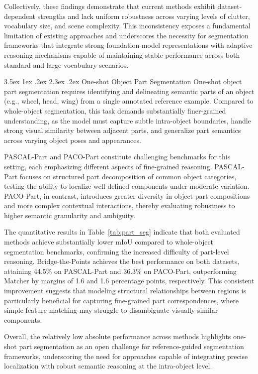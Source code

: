 \documentclass[journal,12pt,onecolumn,draftclsnofoot]{IEEEtran}
\makeatletter
\renewcommand{\section}{\@startsection{section}{1}{\z@}%
    {3.5ex \@plus 1ex \@minus .2ex}%
    {2.3ex \@plus.2ex}%
    {\normalfont\Large\bfseries}}
\makeatother
\begin{document}
Collectively, these findings demonstrate that current methods exhibit dataset-dependent strengths and lack uniform robustness across varying levels of clutter, vocabulary size, and scene complexity. This inconsistency exposes a fundamental limitation of existing approaches and underscores the necessity for segmentation frameworks that integrate strong foundation-model representations with adaptive reasoning mechanisms capable of maintaining stable performance across both standard and large-vocabulary scenarios.

\section{One-shot Object Part Segmentation}
One-shot object part segmentation requires identifying and delineating semantic parts of an object (e.g., wheel, head, wing) from a single annotated reference example. Compared to whole-object segmentation, this task demands substantially finer-grained understanding, as the model must capture subtle intra-object boundaries, handle strong visual similarity between adjacent parts, and generalize part semantics across varying object poses and appearances.

PASCAL-Part and PACO-Part constitute challenging benchmarks for this setting, each emphasizing different aspects of fine-grained reasoning. PASCAL-Part focuses on structured part decomposition of common object categories, testing the ability to localize well-defined components under moderate variation. PACO-Part, in contrast, introduces greater diversity in object-part compositions and more complex contextual interactions, thereby evaluating robustness to higher semantic granularity and ambiguity.

The quantitative results in Table~\ref{tab:part_seg} indicate that both evaluated methods achieve substantially lower mIoU compared to whole-object segmentation benchmarks, confirming the increased difficulty of part-level reasoning. Bridge-the-Points achieves the best performance on both datasets, attaining 44.5\% on PASCAL-Part and 36.3\% on PACO-Part, outperforming Matcher by margins of 1.6 and 1.6 percentage points, respectively. This consistent improvement suggests that modeling structural relationships between regions is particularly beneficial for capturing fine-grained part correspondences, where simple feature matching may struggle to disambiguate visually similar components.

Overall, the relatively low absolute performance across methods highlights one-shot part segmentation as an open challenge for reference-guided segmentation frameworks, underscoring the need for approaches capable of integrating precise localization with robust semantic reasoning at the intra-object level.
\end{document}
